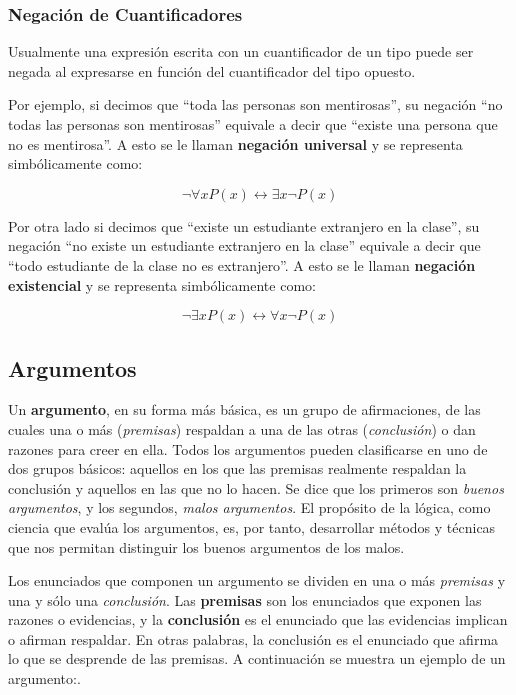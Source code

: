 \subsubsection{Negación de Cuantificadores}

Usualmente una expresión escrita con un cuantificador de un tipo puede ser negada al expresarse en función del cuantificador del tipo opuesto. 

Por ejemplo, si decimos que ``toda las personas son mentirosas'', su negación ``no todas las personas son mentirosas'' equivale a decir que ``existe una persona que no es mentirosa''. A esto se le llaman \textbf{negación universal} y se representa simbólicamente como:

$$\neg \forall{x}P(x) \leftrightarrow \exists{x} \neg P(x)$$

Por otra lado si decimos que ``existe un estudiante extranjero en la clase'', su negación ``no existe un estudiante extranjero en la clase'' equivale a decir que ``todo estudiante de la clase no es extranjero''. A esto se le llaman \textbf{negación existencial} y se representa simbólicamente como: 

$$\neg \exists{x}P(x) \leftrightarrow \forall{x} \neg P(x)$$

\subsection{Argumentos}

Un \textbf{argumento}, en su forma más básica, es un grupo de afirmaciones, de las cuales una o más (\textit{premisas}) respaldan a una de las otras (\textit{conclusión}) o dan razones para creer en ella. Todos los argumentos pueden clasificarse en uno de dos grupos básicos: aquellos en los que las premisas realmente respaldan la conclusión y aquellos en las que no lo hacen. Se dice que los primeros son \textit{buenos argumentos}, y los segundos, \textit{malos argumentos}. El propósito de la lógica, como ciencia que evalúa los argumentos, es, por tanto, desarrollar métodos y técnicas que nos permitan distinguir los buenos argumentos de los malos.

Los enunciados que componen un argumento se dividen en una o más \textit{premisas} y una y sólo una \textit{conclusión}. Las \textbf{premisas} son los enunciados que exponen las razones o evidencias, y la \textbf{conclusión} es el enunciado que las evidencias implican o afirman respaldar. En otras palabras, la conclusión es el enunciado que afirma lo que se desprende de las premisas. A continuación se muestra un ejemplo de un argumento:.

